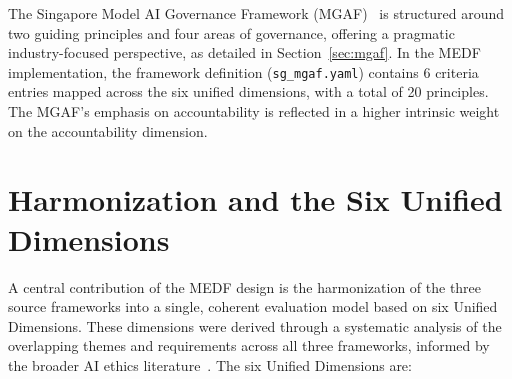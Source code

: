 The Singapore Model AI Governance Framework (MGAF)~\cite{pdpc2020mgaf} is structured around two guiding principles and four areas of governance, offering a pragmatic industry-focused perspective, as detailed in Section~\ref{sec:mgaf}. In the MEDF implementation, the framework definition (\texttt{sg\_mgaf.yaml}) contains 6 criteria entries mapped across the six unified dimensions, with a total of 20 principles. The MGAF's emphasis on accountability is reflected in a higher intrinsic weight on the accountability dimension.

\section{Harmonization and the Six Unified Dimensions}
\label{sec:harmonization}

A central contribution of the MEDF design is the harmonization of the three source frameworks into a single, coherent evaluation model based on six Unified Dimensions. These dimensions were derived through a systematic analysis of the overlapping themes and requirements across all three frameworks, informed by the broader AI ethics literature~\cite{floridi2018ai4people,jobin2019landscape}. The six Unified Dimensions are:

